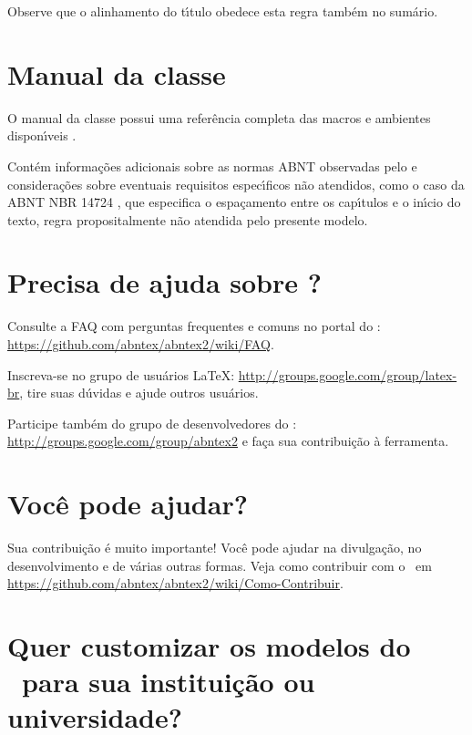 Observe que o alinhamento do t\'{\i}tulo obedece esta regra tamb\'em no sum\'ario.
	

\section{Manual da classe \textsf{\abnTeX}}

O manual da classe \textsf{\abnTeX} possui uma refer\^encia completa das macros e ambientes dispon\'{\i}veis \cite{abnetxclasse}.

Cont\'em informa\c{c}\~oes adicionais sobre as normas ABNT
observadas pelo \textsf{\abnTeX} e considera\c{c}\~oes sobre eventuais requisitos espec\'{\i}ficos
n\~ao atendidos, como o caso da ABNT NBR 14724 \cite{nbr14724}, que
especifica o espa\c{c}amento entre os cap\'{\i}tulos e o in\'{\i}cio do texto, regra
propositalmente n\~ao atendida pelo presente modelo.

\section{Precisa de ajuda sobre \textsf{\abnTeX}?}

Consulte a FAQ com perguntas frequentes e comuns no portal do \textsf{\abnTeX}:
\url{https://github.com/abntex/abntex2/wiki/FAQ}.

Inscreva-se no grupo de usu\'arios \LaTeX:
\url{http://groups.google.com/group/latex-br}, tire suas d\'uvidas e ajude
outros usu\'arios.

Participe tamb\'em do grupo de desenvolvedores do \textsf{\abnTeX}:
\url{http://groups.google.com/group/abntex2} e fa\c{c}a sua contribui\c{c}\~ao \`a
ferramenta.

\section{Voc\^e pode ajudar?}

Sua contribui\c{c}\~ao \'e muito importante! Voc\^e pode ajudar na divulga\c{c}\~ao, no
desenvolvimento e de v\'arias outras formas. Veja como contribuir com o \abnTeX\
em \url{https://github.com/abntex/abntex2/wiki/Como-Contribuir}.

\section{Quer customizar os modelos do \abnTeX\ para sua institui\c{c}\~ao ou
universidade?}

